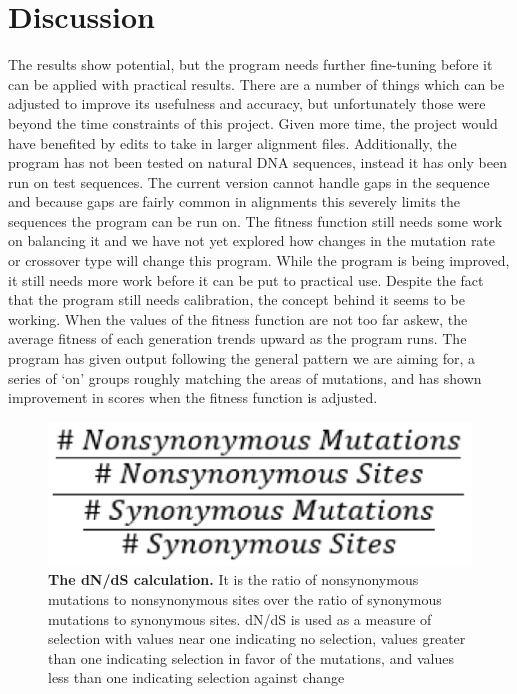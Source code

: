 \documentclass{article}
\begin{document}
\section{Discussion}
The results show potential, but the program needs further fine-tuning before it can be applied with practical results.  There are a number of things which can be adjusted to improve its usefulness and accuracy, but unfortunately those were beyond the time constraints of this project.  Given more time, the project would have benefited by edits to take in larger alignment files.  Additionally, the program has not been tested on natural DNA sequences, instead it has only been run on test sequences.  The current version cannot handle gaps in the sequence and because gaps are fairly common in alignments this severely limits the sequences the program can be run on. The fitness function still needs some work on balancing it and we have not yet explored how changes in the mutation rate or crossover type will change this program.  While the program is being improved, it still needs more work before it can be put to practical use.
Despite the fact that the program still needs calibration, the concept behind it seems to be working. When the values of the fitness function are not too far askew, the average fitness of each generation trends upward as the program runs.  The program has given output following the general pattern we are aiming for, a series of ‘on’ groups roughly matching the areas of mutations, and has shown improvement in scores when the fitness function is adjusted.

\begin{figure}
    \centering
    \includegraphics{amelia_fig1.png}
    \caption{\textbf{The dN/dS calculation.}  It is the ratio of nonsynonymous mutations to nonsynonymous sites over the ratio of synonymous mutations to synonymous sites.  dN/dS is used as a measure of selection with values near one indicating no selection, values greater than one indicating selection in favor of the mutations, and values less than one indicating selection against change}
    \label{fig:my_label}
\end{figure}
\end{document}
